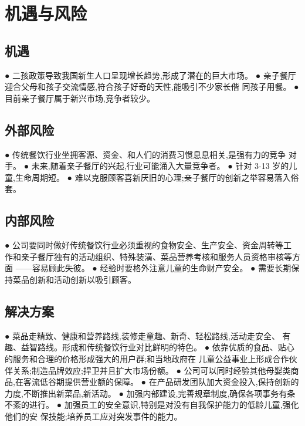 \chapter{机遇与风险}
\section{机遇}
● 二孩政策导致我国新生人口呈现增长趋势,形成了潜在的巨大市场。
● 亲子餐厅迎合父母和孩子交流情感,符合孩子好奇的天性,能吸引不少家长偕
同孩子用餐。
● 目前亲子餐厅属于新兴市场,竞争者较少。


\section{外部风险}
● 传统餐饮行业坐拥客源、资金、和人们的消费习惯息息相关,是强有力的竞争
对手。
● 未来,随着亲子餐厅的兴起,行业可能涌入大量竞争者。
● 针对 3-13 岁的儿童,生命周期短。
● 难以克服顾客喜新厌旧的心理;亲子餐厅的创新之举容易落入俗套。

\section{内部风险}
● 公司要同时做好传统餐饮行业必须重视的食物安全、生产安全、资金周转等工
作和亲子餐厅独有的活动组织、特殊装潢、菜品营养考核和服务人员资格审核等方面
——容易顾此失彼。
● 经验时要格外注意儿童的生命财产安全。
● 需要长期保持菜品创新和活动创新以吸引顾客。

\section{解决方案}
● 菜品走精致、健康和营养路线,装修走童趣、新奇、轻松路线,活动走安全、
有趣、益智路线。形成和传统餐饮行业对比鲜明的特色。
● 依靠优质的食品、贴心的服务和合理的价格形成强大的用户群;和当地政府在
儿童公益事业上形成合作伙伴关系;制造品牌效应;捍卫并且扩大市场份额。
● 公司可以同时经验其他母婴类商品,在客流低谷期提供营业额的保障。
● 在产品研发团队加大资金投入,保持创新的力度,不断推出新菜品,新活动。
● 加强内部建设,完善规章制度,确保各项事务有条不紊的进行。
● 加强员工的安全意识,特别是对没有自我保护能力的低龄儿童,强化他们的安
保技能;培养员工应对突发事件的能力。



